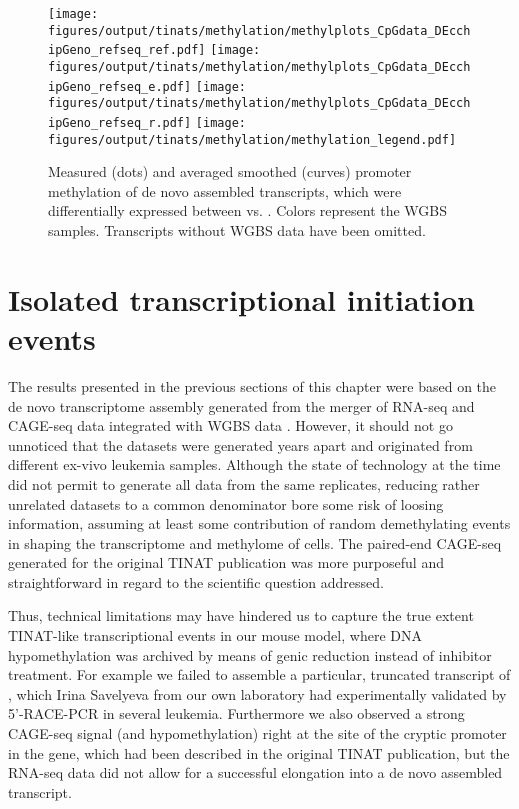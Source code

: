 \begin{figure}[!ht]
	\centering
	\texttt{[image: figures/output/tinats/methylation/methylplots\_CpGdata\_DEcchipGeno\_refseq\_ref.pdf]}
	\texttt{[image: figures/output/tinats/methylation/methylplots\_CpGdata\_DEcchipGeno\_refseq\_e.pdf]} 
	\texttt{[image: figures/output/tinats/methylation/methylplots\_CpGdata\_DEcchipGeno\_refseq\_r.pdf]}
	\texttt{[image: figures/output/tinats/methylation/methylation\_legend.pdf]} 
	\caption{Measured (dots) and averaged smoothed (curves) promoter methylation of de novo assembled transcripts, which were differentially expressed between \dnmtchip vs. \dnmtwt. Colors represent the WGBS samples. Transcripts without WGBS data have been omitted.}
	\label{fig:methylplots_CpGdata_DEcchipGeno_refseq_ref}
\end{figure}

\section{Isolated transcriptional initiation events}
\label{chap:r:tinats:denovolocalization}

The results presented in the previous sections of this chapter were based on the de novo transcriptome assembly generated from the merger of RNA-seq and CAGE-seq data integrated with WGBS data . However, it should not go unnoticed that the datasets were generated years apart and originated from different ex-vivo leukemia samples. Although the state of technology at the time did not permit to generate all data from the same replicates, reducing rather unrelated datasets to a common denominator bore some risk of loosing information, assuming at least some contribution of random demethylating events in shaping the transcriptome and methylome of \dnmtchip cells. The paired-end CAGE-seq generated for the original TINAT publication\cite{Brocks2017} was more purposeful and straightforward in regard to the scientific question addressed. 

Thus, technical limitations may have hindered us to capture the true extent TINAT-like transcriptional events in our mouse model, where DNA hypomethylation was archived by means of genic  reduction instead of inhibitor treatment. For example we failed to assemble a particular, truncated transcript of , which Irina Savelyeva from our own laboratory had experimentally validated by 5'-RACE-PCR in several \dnmtchip leukemia. Furthermore we also observed a strong CAGE-seq signal (and hypomethylation) right at the site of the cryptic promoter in the  gene, which had been described in the original TINAT publication\cite{Brocks2017}, but the RNA-seq data did not allow for a successful elongation into a de novo assembled transcript.

